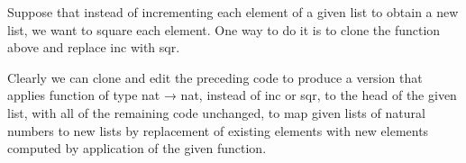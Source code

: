 \documentclass[letterpaper,10pt,english]{sphinxmanual}
\begin{document}
\begin{sphinxVerbatim}[commandchars=\\\{\}]
       
   
     

 \PYG{o}{[}\PYG{o}{]}        
  \PYG{o}{[}\PYG{o}{]}  
\end{sphinxVerbatim}

\sphinxAtStartPar
Suppose that instead of incrementing each element
of a given list to obtain a new list, we want to
square each element. One way to do it is to clone
the function above and replace inc with sqr.

\begin{sphinxVerbatim}[commandchars=\\\{\}]
       
   
     

  \PYG{o}{[}\PYG{o}{]}
\end{sphinxVerbatim}

\sphinxAtStartPar
Clearly we can clone and edit the preceding code
to produce a version that applies  function of
type nat → nat, instead of inc or sqr, to the head
of the given list, with all of the remaining code
unchanged, to map given lists of natural numbers
to new lists by replacement of existing elements
with new elements computed by application of the
given function.
\end{document}
